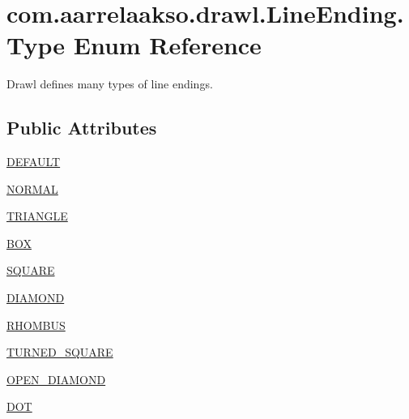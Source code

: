 \hypertarget{enumcom_1_1aarrelaakso_1_1drawl_1_1_line_ending_1_1_type}{}\section{com.\+aarrelaakso.\+drawl.\+Line\+Ending.\+Type Enum Reference}
\label{enumcom_1_1aarrelaakso_1_1drawl_1_1_line_ending_1_1_type}


Drawl defines many types of line endings.  


\subsection*{Public Attributes}
\begin{DoxyCompactItemize}
\item 
\hyperlink{enumcom_1_1aarrelaakso_1_1drawl_1_1_line_ending_1_1_type_a60839eb2ed0486a6f9f987c64d27e313}{D\+E\+F\+A\+U\+LT}
\item 
\hyperlink{enumcom_1_1aarrelaakso_1_1drawl_1_1_line_ending_1_1_type_a1f96f154af5043259b200495ec8b2af6}{N\+O\+R\+M\+AL}
\item 
\hyperlink{enumcom_1_1aarrelaakso_1_1drawl_1_1_line_ending_1_1_type_a175880412926b2126d70c22ae7396009}{T\+R\+I\+A\+N\+G\+LE}
\item 
\hyperlink{enumcom_1_1aarrelaakso_1_1drawl_1_1_line_ending_1_1_type_a1a09668e1434b10944872ae23112e058}{B\+OX}
\item 
\hyperlink{enumcom_1_1aarrelaakso_1_1drawl_1_1_line_ending_1_1_type_aef742b7c544e685f8e670db7a1b1cc4b}{S\+Q\+U\+A\+RE}
\item 
\hyperlink{enumcom_1_1aarrelaakso_1_1drawl_1_1_line_ending_1_1_type_aa3ce0f93b6befa8383c516df010aeed4}{D\+I\+A\+M\+O\+ND}
\item 
\hyperlink{enumcom_1_1aarrelaakso_1_1drawl_1_1_line_ending_1_1_type_a08590ccad906f75be8d0a27215bd07e2}{R\+H\+O\+M\+B\+US}
\item 
\hyperlink{enumcom_1_1aarrelaakso_1_1drawl_1_1_line_ending_1_1_type_ae2bef871a847ab802cf25e83853a3372}{T\+U\+R\+N\+E\+D\+\_\+\+S\+Q\+U\+A\+RE}
\item 
\hyperlink{enumcom_1_1aarrelaakso_1_1drawl_1_1_line_ending_1_1_type_a13f6d6fbec0c37e1b87096ceb067ee6b}{O\+P\+E\+N\+\_\+\+D\+I\+A\+M\+O\+ND}
\item 
\hyperlink{enumcom_1_1aarrelaakso_1_1drawl_1_1_line_ending_1_1_type_a396196f34ff54525c071d7d061abd5f4}{D\+OT}
\item 

\end{DoxyCompactItemize}
